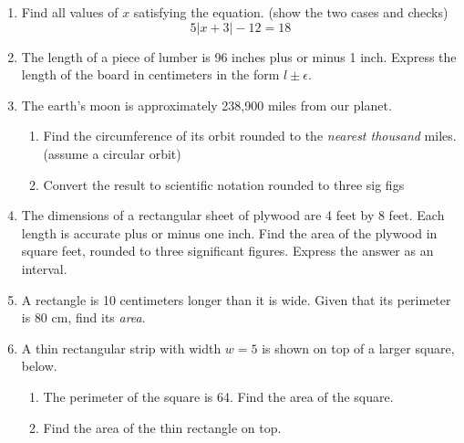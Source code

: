 \begin{enumerate}
\item Find all values of $x$ satisfying the equation. (show the two cases and checks) 
$$ 5|x+3|-12 = 18$$

\newpage
\item The length of a piece of lumber is 96 inches plus or minus 1 inch. Express the length of the board in centimeters in the form $l \pm \epsilon$. \vspace{3cm}

\item The earth's moon is approximately 238,900 miles from our planet. 
\begin{enumerate}
  \item Find the circumference of its orbit rounded to the \emph{nearest thousand} miles. (assume a circular orbit) \vspace{1cm}
  \item Convert the result to scientific notation rounded to three sig figs
\end{enumerate} \vspace{1cm}

\item The dimensions of a rectangular sheet of plywood are 4 feet by 8 feet. Each length is accurate plus or minus one inch. Find the area of the plywood in square feet, rounded to three significant figures. Express the answer as an interval. \vspace{3cm}

\item A rectangle is 10 centimeters longer than it is wide. Given that its perimeter is $80 \text{ cm}$, find its \emph{area}. 
  \begin{flushleft}
  \end{flushleft} \vspace{4cm}

\newpage
\item A thin rectangular strip with width $w=5$ is shown on top of a larger square, below.
  \begin{multicols}{2}
    \begin{enumerate}
      \item The perimeter of the square is 64. Find the area of the square. \vspace{2cm}
      \item Find the area of the thin rectangle on top.
      \end{enumerate}
    \end{multicols}
  

\end{enumerate}
